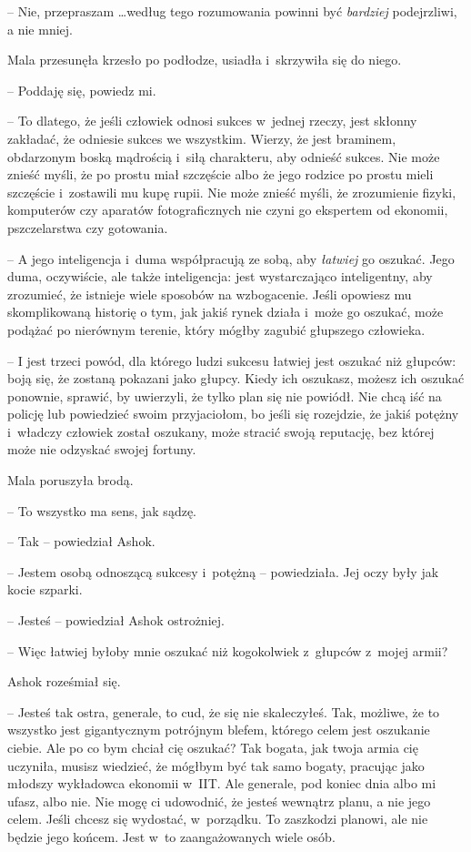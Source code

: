 \documentclass[oneside,polish,11pt,rmheadings]{mwbk}
\begin{document}
-- Nie, przepraszam  \ldots  według tego rozumowania powinni być \textit{bardziej }podejrzliwi, a nie mniej.

Mala przesunęła krzesło po podłodze, usiadła i~skrzywiła się do niego. 

-- Poddaję się, powiedz mi. 

-- To dlatego, że jeśli człowiek odnosi sukces w~jednej rzeczy, jest skłonny zakładać, że odniesie sukces we wszystkim. Wierzy, że jest braminem, obdarzonym boską mądrością i~siłą charakteru, aby odnieść sukces. Nie może znieść myśli, że po prostu miał szczęście albo że jego rodzice po prostu mieli szczęście i~zostawili mu kupę rupii. Nie może znieść myśli, że zrozumienie fizyki, komputerów czy aparatów fotograficznych nie czyni go ekspertem od ekonomii, pszczelarstwa czy gotowania.

-- A jego inteligencja i~duma współpracują ze sobą, aby \textit{łatwiej }go oszukać. Jego duma, oczywiście, ale także inteligencja: jest wystarczająco inteligentny, aby zrozumieć, że istnieje wiele sposobów na wzbogacenie. Jeśli opowiesz mu skomplikowaną historię o tym, jak jakiś rynek działa i~może go oszukać, może podążać po nierównym terenie, który mógłby zagubić głupszego człowieka.

-- I jest trzeci powód, dla którego ludzi sukcesu łatwiej jest oszukać niż głupców: boją się, że zostaną pokazani jako głupcy. Kiedy ich oszukasz, możesz ich oszukać ponownie, sprawić, by uwierzyli, że tylko plan się nie powiódł. Nie chcą iść na policję lub powiedzieć swoim przyjaciołom, bo jeśli się rozejdzie, że jakiś potężny i~władczy człowiek został oszukany, może stracić swoją reputację, bez której może nie odzyskać swojej fortuny.

Mala poruszyła brodą. 

-- To wszystko ma sens, jak sądzę.

-- Tak -- powiedział Ashok.

-- Jestem osobą odnoszącą sukcesy i~potężną -- powiedziała. Jej oczy były jak kocie szparki.

-- Jesteś -- powiedział Ashok ostrożniej.

-- Więc łatwiej byłoby mnie oszukać niż kogokolwiek z~głupców z~mojej armii?

Ashok roześmiał się. 

-- Jesteś tak ostra, generale, to cud, że się nie skaleczyłeś. Tak, możliwe, że to wszystko jest gigantycznym potrójnym blefem, którego celem jest oszukanie ciebie. Ale po co bym chciał cię oszukać? Tak bogata, jak twoja armia cię uczyniła, musisz wiedzieć, że mógłbym być tak samo bogaty, pracując jako młodszy wykładowca ekonomii w~IIT. Ale generale, pod koniec dnia albo mi ufasz, albo nie. Nie mogę ci udowodnić, że jesteś wewnątrz planu, a nie jego celem. Jeśli chcesz się wydostać, w~porządku. To zaszkodzi planowi, ale nie będzie jego końcem. Jest w~to zaangażowanych wiele osób.
\end{document}
